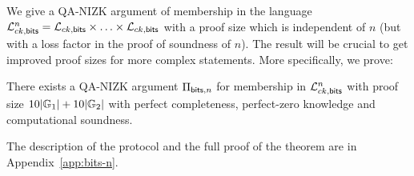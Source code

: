 We give a QA-NIZK argument of membership in the language $\mathcal{L}_{ck,\mathsf{bits}}^n  = \mathcal{L}_{ck,\mathsf{bits}} \times \ldots \times \mathcal{L}_{ck,\mathsf{bits}}$ with a proof size which is independent of $n$ (but with a loss factor in the proof of soundness of $n$). The result will be crucial to get improved proof sizes for more complex statements. More specifically, we prove: 


\begin{theorem} \label{theo:bitsnm} There exists a QA-NIZK argument $\Pi_{\mathsf{bits},n}$  for membership in $\mathcal{L}_{ck,\mathsf{bits}}^n$ with proof size  
$10|\mathbb{G}_1|+10|\mathbb{G}_2|$ with perfect completeness, perfect-zero knowledge and computational soundness. 
\end{theorem}

The description of the protocol and the full proof of the theorem are in Appendix~\ref{app:bits-n}. 
